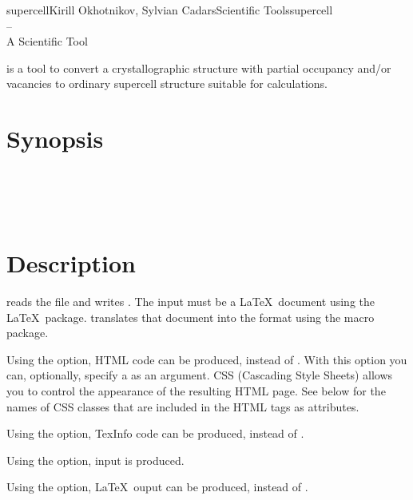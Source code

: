 \documentclass[a4paper,english]{article}
\begin{document}
\begin{Name}{1}{supercell}{Kirill Okhotnikov, Sylvian Cadars}{Scientific Tools}{supercell\\--\\ A Scientific Tool}

   is a tool to convert a crystallographic structure with partial occupancy and/or vacancies to  ordinary supercell structure suitable for calculations.
\end{Name}

\section{Synopsis}

 \\
   \\
   \\

\section{Description}
 reads the file  and writes . The
input must be a \LaTeX\ document using the  \LaTeX\ package.
 translates that document into the  format using
the  macro package.

Using the  option, HTML code can be produced, instead of
.
With this option you can, optionally, specify a  as an argument.
CSS (Cascading Style Sheets) allows you to control the appearance of the resulting HTML page.
See below for the names of CSS classes that are included in the HTML tags as attributes.

Using the  option, TexInfo code can be produced, instead of
.

Using the  option,  input is produced.

Using the  option, \LaTeX\ ouput can be produced, instead of
.
\end{document}
